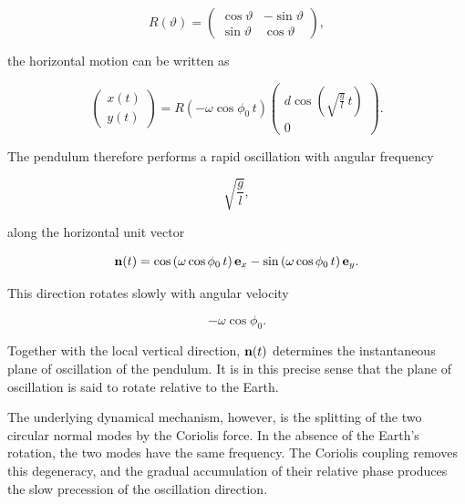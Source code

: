 \documentclass[12pt]{article}
\begin{document}
\[
R(\vartheta)
=
\begin{pmatrix}
\cos\vartheta & -\sin\vartheta\\
\sin\vartheta & \cos\vartheta
\end{pmatrix},
\]

the horizontal motion can be written as

\begin{equation}
  \begin{pmatrix}
    x(t)\\
    y(t)
  \end{pmatrix}
  =
  R\left(-\omega\cos\phi_0\,t\right)
  \begin{pmatrix}
    d\cos\left(\sqrt{\frac{g}{l}}\,t\right)\\
    0
  \end{pmatrix}.
  \label{eq:foucault-rotating-direction}
\end{equation}

The pendulum therefore performs a rapid oscillation with angular frequency

\[
\sqrt{\frac{g}{l}},
\]

along the horizontal unit vector

\[
\vb n(t)
=
\cos\left(\omega\cos\phi_0\,t\right)\vb e_x
-
\sin\left(\omega\cos\phi_0\,t\right)\vb e_y.
\]

This direction rotates slowly with angular velocity

\[
-\omega\cos\phi_0.
\]

Together with the local vertical direction, \(\vb n(t)\) determines the
instantaneous plane of oscillation of the pendulum. It is in this precise
sense that the plane of oscillation is said to rotate relative to the Earth.

The underlying dynamical mechanism, however, is the splitting of the two
circular normal modes by the Coriolis force. In the absence of the Earth's
rotation, the two modes have the same frequency. The Coriolis coupling removes
this degeneracy, and the gradual accumulation of their relative phase produces
the slow precession of the oscillation direction.
\end{document}
